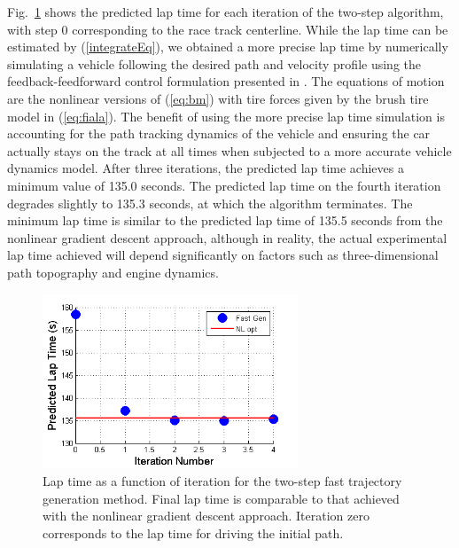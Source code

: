 \documentclass[twocolumn,10pt, final]{asme2e}
\begin{document}
Fig.~\ref{lapTimes} shows the predicted lap time for each iteration of the two-step algorithm, with step 0 corresponding
to the race track centerline.  While the lap time can be estimated by (\ref{integrateEq}), we 
obtained a more precise lap time by numerically simulating a vehicle following the desired path and velocity profile using the feedback-feedforward control formulation
presented in \cite{mickgeneral}. The equations of motion are the nonlinear versions of (\ref{eq:bm}) with tire forces given by
the brush tire model in (\ref{eq:fiala}). The benefit of using the more precise lap time simulation is accounting for the path tracking dynamics
 of the vehicle and ensuring the car actually stays on the track at all times when subjected to a more accurate vehicle dynamics model. 
 After three iterations, the predicted lap time achieves a minimum value of 135.0 seconds. The predicted lap time
on the fourth iteration degrades slightly to 135.3 seconds, at which the algorithm terminates. The minimum lap time is similar 
to the predicted lap time of 135.5 seconds from the nonlinear gradient descent approach, 
although in reality, the actual experimental lap time achieved  will depend significantly on factors such 
as three-dimensional path topography and engine dynamics.  

\begin{figure}
\centering
\includegraphics[width=3in]{figures/laptimes.png}
\caption{Lap time as a function of iteration for the two-step fast trajectory generation method. Final lap time is comparable
to that achieved with the nonlinear gradient descent approach. Iteration zero corresponds to the lap time for driving the initial path.}
\label{lapTimes}
\end{figure}
\end{document}
